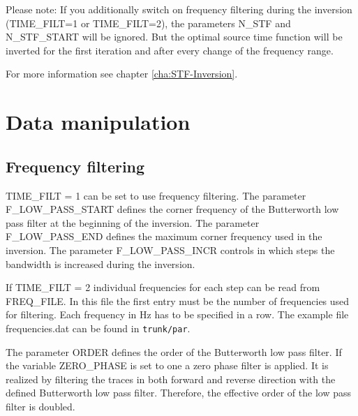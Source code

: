Please note: If you additionally switch on frequency filtering during the inversion (TIME\_FILT=1 or TIME\_FILT=2), the parameters N\_STF and N\_STF\_START will be ignored. But the optimal source time function will be inverted for the first iteration and after every change of the frequency range.

For more information see chapter \ref{cha:STF-Inversion}.


\section{Data manipulation}
\subsection{Frequency filtering}
\label{sec:filtering}
{\color{blue}{\begin{verbatim}
"Frequency filtering during inversion" : "comment",
			"TIME_FILT" : "0",
			"F_HIGH_PASS" : "1",
			"F_LOW_PASS_START" : "10.0",
			"F_LOW_PASS_END" : "75.0",
			"F_LOW_PASS_INCR" : "10.0",
			"ORDER" : "2",
			"ZERO_PHASE" : "0",
			"FREQ_FILE"  : "frequencies.dat",
			"WRITE_FILTERED_DATA" : "0",
			
			"Minimum number of iteration per frequency" : "comment",
			"MIN_ITER" : "10",
\end{verbatim}}}

{\color{red}{\begin{verbatim}
Default values are:
	TIME_FILT=0
	ZERO_PHASE=0
	MIN_ITER=0
\end{verbatim}}}

TIME\_FILT = 1 can be set to use frequency filtering. The parameter F\_LOW\_PASS\_START defines the corner frequency of the Butterworth low pass filter at the beginning of the inversion. The parameter F\_LOW\_PASS\_END defines the maximum corner frequency used in the inversion. The parameter F\_LOW\_PASS\_INCR controls in which steps the bandwidth is increased during the inversion.

If TIME\_FILT = 2 individual frequencies for each step can be read from FREQ\_FILE. In this file the first entry must be the number of frequencies used for filtering. Each frequency in Hz has to be specified in a row. The example file frequencies.dat can be found in \texttt{trunk/par}.

The parameter ORDER defines the order of the Butterworth low pass filter. If the variable ZERO\_PHASE is set to one a zero phase filter is applied. It is realized by filtering the traces in both forward and reverse direction with the defined Butterworth low pass filter. Therefore, the effective order of the low pass filter is doubled. 


